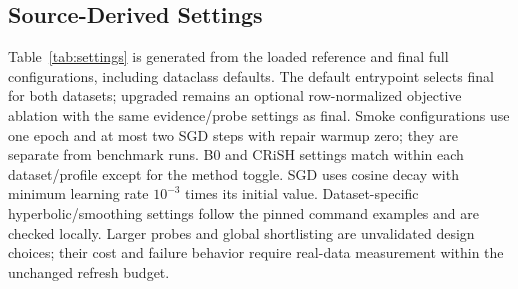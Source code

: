 \documentclass[conference]{IEEEtran}
\begin{document}
\subsection{Source-Derived Settings}
Table~\ref{tab:settings} is generated from the loaded reference and final full configurations, including dataclass defaults. The default entrypoint selects final for both datasets; upgraded remains an optional row-normalized objective ablation with the same evidence/probe settings as final. Smoke configurations use one epoch and at most two SGD steps with repair warmup zero; they are separate from benchmark runs. B0 and CRiSH settings match within each dataset/profile except for the method toggle. SGD uses cosine decay with minimum learning rate $10^{-3}$ times its initial value. Dataset-specific hyperbolic/smoothing settings follow the pinned command examples and are checked locally. Larger probes and global shortlisting are unvalidated design choices; their cost and failure behavior require real-data measurement within the unchanged refresh budget.
\end{document}
